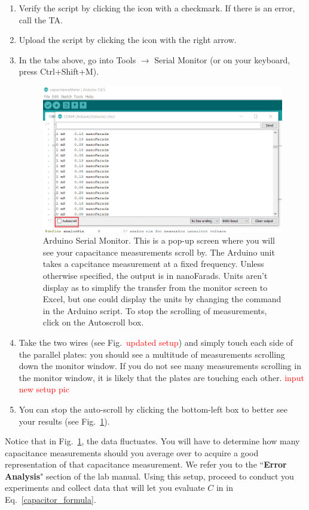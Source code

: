 \documentclass[12pt]{report}
\def \todo #1{\textcolor{red}{#1}}
\begin{document}
\begin{enumerate}
\item Verify the script by clicking the icon with a checkmark. If there is an error, call the TA.
\item Upload the script by clicking the icon with the right arrow.
\item In the tabs above, go into Tools $\rightarrow$ Serial Monitor (or on your keyboard, press Ctrl+Shift+M).
\begin{figure}[h]
\centering
\includegraphics[width=0.85 \textwidth]{lab1-Arduino-monitor.png}
\caption{Arduino Serial Monitor. This is a pop-up screen where you will see your capacitance measurements scroll by. The Arduino unit takes a capcitance measurement at a fixed frequency. Unless otherwise specified, the output is in nanoFarads. Units aren't display as to simplify the transfer from the monitor screen to Excel, but one could display the units by changing the command in the Arduino script. To stop the scrolling of measurements, click on the Autoscroll box.}
\label{Fig:Arduino-Monitor}
\end{figure}

\item Take the two wires (see Fig.~\todo{updated setup}) and simply touch each side of the parallel plates: you should see a multitude of measurements scrolling down the monitor window. If you do not see many measurements scrolling in the monitor window, it is likely that the plates are touching each other. \todo{input new setup pic}
\item You can stop the auto-scroll by clicking the bottom-left box to better see your results (see Fig.~\ref{Fig:Arduino-Monitor}).
\end{enumerate}

Notice that in Fig.~\ref{Fig:Arduino-Monitor}, the data fluctuates. You will have to determine how many capacitance measurements should you average over to acquire a good representation of that capacitance measurement. We refer you to the ``\textbf{Error Analysis}" section of the lab manual. Using this setup, proceed to conduct you experiments and collect data that will let you evaluate $C$ in in Eq.~\ref{capacitor_formula}. 
\end{document}
